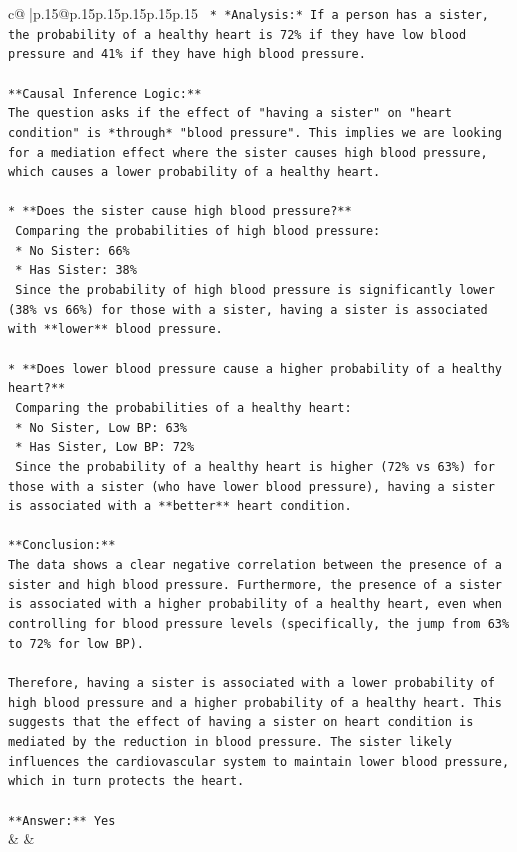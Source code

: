 \documentclass{article}
\begin{document}
{\begin{supertabular}{c@{$\;$}|p{.15\linewidth}@{}p{.15\linewidth}p{.15\linewidth}p{.15\linewidth}p{.15\linewidth}p{.15\linewidth}}
{{{\texttt{    *   *Analysis:* If a person has a sister, the probability of a healthy heart is 72\% if they have low blood pressure and 41\% if they have high blood pressure.} \\
\\ 
\texttt{**Causal Inference Logic:**} \\
\texttt{The question asks if the effect of "having a sister" on "heart condition" is *through* "blood pressure". This implies we are looking for a mediation effect where the sister causes high blood pressure, which causes a lower probability of a healthy heart.} \\
\\ 
\texttt{*   **Does the sister cause high blood pressure?**} \\
\texttt{    Comparing the probabilities of high blood pressure:} \\
\texttt{    *   No Sister: 66\%} \\
\texttt{    *   Has Sister: 38\%} \\
\texttt{    Since the probability of high blood pressure is significantly lower (38\% vs 66\%) for those with a sister, having a sister is associated with **lower** blood pressure.} \\
\\ 
\texttt{*   **Does lower blood pressure cause a higher probability of a healthy heart?**} \\
\texttt{    Comparing the probabilities of a healthy heart:} \\
\texttt{    *   No Sister, Low BP: 63\%} \\
\texttt{    *   Has Sister, Low BP: 72\%} \\
\texttt{    Since the probability of a healthy heart is higher (72\% vs 63\%) for those with a sister (who have lower blood pressure), having a sister is associated with a **better** heart condition.} \\
\\ 
\texttt{**Conclusion:**} \\
\texttt{The data shows a clear negative correlation between the presence of a sister and high blood pressure. Furthermore, the presence of a sister is associated with a higher probability of a healthy heart, even when controlling for blood pressure levels (specifically, the jump from 63\% to 72\% for low BP).} \\
\\ 
\texttt{Therefore, having a sister is associated with a lower probability of high blood pressure and a higher probability of a healthy heart. This suggests that the effect of having a sister on heart condition is mediated by the reduction in blood pressure. The sister likely influences the cardiovascular system to maintain lower blood pressure, which in turn protects the heart.} \\
\\ 
\texttt{**Answer:** Yes} \\
            }
        }
    }
    & & \\ \\


\end{supertabular}}
\end{document}
